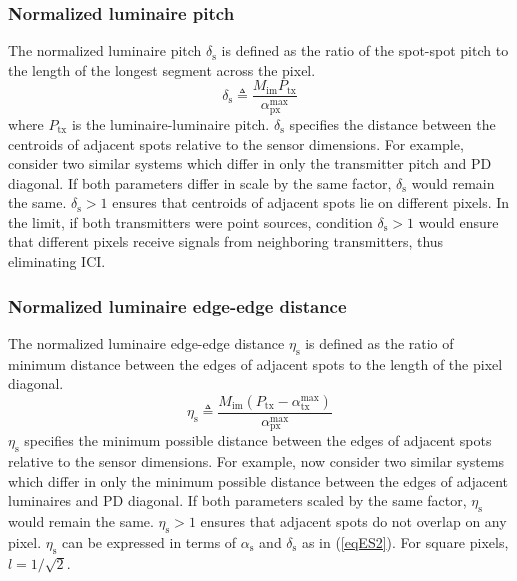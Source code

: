 \subsubsection{Normalized luminaire pitch}
\label{subsubsec:frameworkPitch}
The normalized luminaire pitch $\delta_{\text{s}}$ is defined as the ratio of the spot-spot pitch to the length of the longest segment across the pixel. 
\begin{equation}
	\label{eqDeltaS}
	\delta_{\text{s}} \triangleq \frac{M_{\text{im}} P_{\text{tx}}}{\alpha_{\text{px}}^{\text{max}}}
\end{equation}
where $P_{\text{tx}}$ is the luminaire-luminaire pitch. $\delta_{\text{s}}$ specifies the distance between the centroids of adjacent spots relative to the sensor dimensions. For example, consider two similar systems which differ in only the transmitter pitch and PD diagonal. If both parameters differ in scale by the same factor, $\delta_{\text{s}}$ would remain the same. $\delta_{\text{s}}>1$ ensures that centroids of adjacent spots lie on different pixels. In the limit, if both transmitters were point sources, condition $\delta_{\text{s}}>1$ would ensure that different pixels receive signals from neighboring transmitters, thus eliminating ICI.

\subsubsection{Normalized luminaire edge-edge distance}
\label{subsubsec:frameworkEdge}
The normalized luminaire edge-edge distance $\eta_{\text{s}}$ is defined as the ratio of minimum distance between the edges of adjacent spots to the length of the pixel diagonal.
\begin{equation}
	\label{eqEtaS}
	\eta_{\text{s}} \triangleq \frac{M_{\text{im}}(P_{\text{tx}}-\alpha_{\text{tx}}^{\text{max}})}{\alpha_{\text{px}}^{\text{max}}}
\end{equation}
$\eta_{\text{s}}$ specifies the minimum possible distance between the edges of adjacent spots relative to the sensor dimensions. For example, now consider two similar systems which differ in only the minimum possible distance between the edges of adjacent luminaires and PD diagonal. If both parameters scaled by the same factor, $\eta_{\text{s}}$ would remain the same. $\eta_{\text{s}}>1$ ensures that adjacent spots do not overlap on any pixel. $\eta_{\text{s}}$ can be expressed in terms of $\alpha_{\text{s}}$ and $\delta_{\text{s}}$ as in (\ref{eqES2}). For square pixels, $l=1/\sqrt{2}$.

